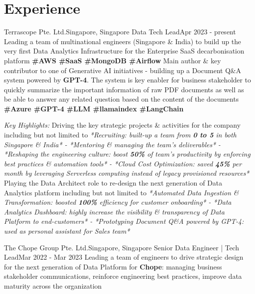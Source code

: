 \section{Experience}
  \resumeSubHeadingListStart
    
    \resumeSubheading
      {Terrascope Pte. Ltd.}{Singapore, Singapore}
      {Data Tech Lead}{Apr 2023 - present}
      \resumeItemListStart
          {Leading a team of multinational engineers (Singapore \& India) to build up the very first Data Analytics Infrastructure for the Enterprise SaaS decarbonisation platform \textbf{\scriptsize{\#AWS \#SaaS \#MongoDB \#Airflow}}}
          {Main author \& key contributor to one of Generative AI initiatives - building up a Document Q\&A system powered by \textbf{GPT-4}. The system is key enabler for business stakeholder to quickly summarize the important information of raw PDF documents as well as be able to answer any related question based on the content of the documents \textbf{\scriptsize{\#Azure \#GPT-4 \#LLM \#llamaindex \#LangChain}}}
      \resumeItemListEnd
      
      \emph{Key Highlights:}
      \resumeItemListStart
          {Driving the key strategic projects \& activities for the company including but not limited to \emph{*Recruiting: built-up a team from \textbf{0 to 5} in both Singapore \& India* - *Mentoring \& managing the team's deliverables* - *Reshaping the engineering culture: boost \textbf{50\%} of team's productivity by enforcing best practices \& automation tools* - *Cloud Cost Optimization: saved \textbf{45\%} per month by leveraging Serverless computing instead of legacy provisioned resources*}}
          {Playing the Data Architect role to re-design the next generation of Data Analytics platform including but not limited to \emph{*Automated Data Ingestion \& Transformation: boosted \textbf{100\%} efficiency for customer onboarding* - *Data Analytics Dashboard: highly increase the visibility \& transparency of Data Platform to end-customers* - *Prototyping Document Q\&A powered by GPT-4: used as personal assistant for Sales team*}}
      \resumeItemListEnd

    \resumeSubheading
      {The Chope Group Pte. Ltd.}{Singapore, Singapore}
      {Senior Data Engineer | Tech Lead}{Mar 2022 - Mar 2023}
      \resumeItemListStart
          {Leading a team of engineers to drive strategic design for the next generation of Data Platform  for \textbf{Chope}: managing business stakeholder communications, reinforce engineering best practices, improve data maturity across the organization}
      \resumeItemListEnd
      
